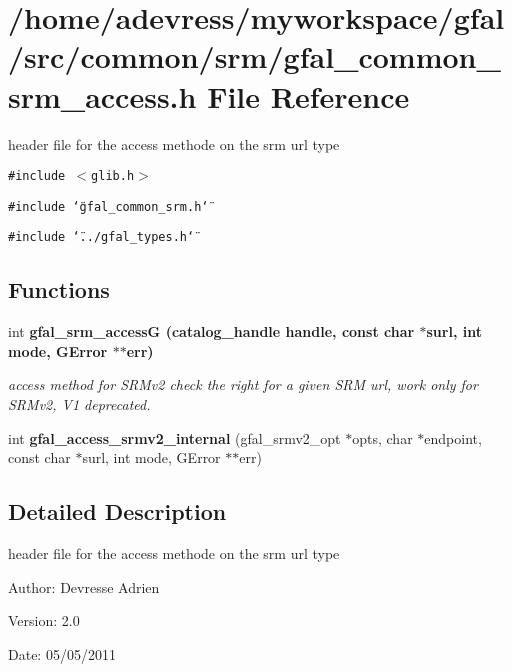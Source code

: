 \section{/home/adevress/myworkspace/gfal/src/common/srm/gfal\_\-common\_\-srm\_\-access.h File Reference}
\label{gfal__common__srm__access_8h}
header file for the access methode on the srm url type 

{\tt \#include $<$glib.h$>$}\par
{\tt \#include \char`\"{}gfal\_\-common\_\-srm.h\char`\"{}}\par
{\tt \#include \char`\"{}../gfal\_\-types.h\char`\"{}}\par
\subsection*{Functions}
\begin{CompactItemize}
\item 
int \bf{gfal\_\-srm\_\-access\-G} (catalog\_\-handle handle, const char $\ast$surl, int mode, GError $\ast$$\ast$err)
\begin{CompactList}\small\item\em access method for SRMv2 check the right for a given SRM url, work only for SRMv2, V1 deprecated. \item\end{CompactList}\item 
int \textbf{gfal\_\-access\_\-srmv2\_\-internal} (gfal\_\-srmv2\_\-opt $\ast$opts, char $\ast$endpoint, const char $\ast$surl, int mode, GError $\ast$$\ast$err)\label{gfal__common__srm__access_8h_482394e183f4026d547f17575dc4b8dd}

\end{CompactItemize}


\subsection{Detailed Description}
header file for the access methode on the srm url type 

\begin{Desc}
\item[Author:]Devresse Adrien \end{Desc}
\begin{Desc}
\item[Version:]2.0 \end{Desc}
\begin{Desc}
\item[Date:]05/05/2011 \end{Desc}


